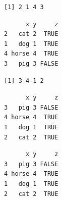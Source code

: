 \documentclass[
  letterpaper,
  DIV=11,
  numbers=noendperiod]{scrreprt}
\newenvironment{Shaded}{\begin{snugshade}}{\end{snugshade}}
\newcommand{\AttributeTok}[1]{\textcolor[rgb]{0.40,0.45,0.13}{#1}}
\newcommand{\CommentTok}[1]{\textcolor[rgb]{0.37,0.37,0.37}{#1}}
\newcommand{\ConstantTok}[1]{\textcolor[rgb]{0.56,0.35,0.01}{#1}}
\newcommand{\FunctionTok}[1]{\textcolor[rgb]{0.28,0.35,0.67}{#1}}
\newcommand{\NormalTok}[1]{\textcolor[rgb]{0.00,0.23,0.31}{#1}}
\newcommand{\SpecialCharTok}[1]{\textcolor[rgb]{0.37,0.37,0.37}{#1}}
\begin{document}
\begin{verbatim}
[1] 2 1 4 3
\end{verbatim}

\begin{Shaded}
\end{Shaded}

\begin{verbatim}
      x y     z
2   cat 2  TRUE
1   dog 1  TRUE
4 horse 4  TRUE
3   pig 3 FALSE
\end{verbatim}

\begin{Shaded}
\end{Shaded}

\begin{verbatim}
[1] 3 4 1 2
\end{verbatim}

\begin{Shaded}
\end{Shaded}

\begin{verbatim}
      x y     z
3   pig 3 FALSE
4 horse 4  TRUE
1   dog 1  TRUE
2   cat 2  TRUE
\end{verbatim}

\begin{Shaded}
\end{Shaded}

\begin{verbatim}
      x y     z
3   pig 3 FALSE
4 horse 4  TRUE
1   dog 1  TRUE
2   cat 2  TRUE
\end{verbatim}
\end{document}
